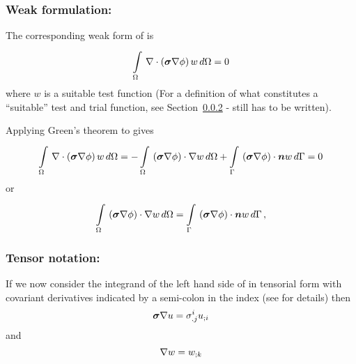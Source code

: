 \subsubsection{Weak formulation:}

The corresponding weak form of  is
\begin{equation}
  \gint{\Omega}{}{\divergence{}{\pbrac{\tensor{\sigma}\gradient{}{\phi}}}w}{\Omega}=0 
  \label{eqn:Laplaceweakform}
\end{equation}
where $w$ is a suitable test function (For a definition of what constitutes a
``suitable'' test and trial function, see Section~\ref{} - still has to be written).

Applying Green's theorem to  gives
\begin{equation}
 \gint{\Omega}{}{\divergence{}{\pbrac{\tensor{\sigma}\gradient{}{\phi}}}w}{\Omega}
 = -\gint{\Omega}{}{\dotprod{\pbrac{\tensor{\sigma}\gradient{}{\phi}}}{\gradient{}{w}}}{\Omega}
   +\gint{\Gamma}{}{\dotprod{\pbrac{\tensor{\sigma}\gradient{}{\phi}}}{\vect{n}}w}{\Gamma}
 = 0
\end{equation}
or
\begin{equation}
  \gint{\Omega}{}{\dotprod{\pbrac{\tensor{\sigma}\gradient{}{\phi}}}{\gradient{}{w}}}{\Omega}
  = \gint{\Gamma}{}{\dotprod{\pbrac{\tensor{\sigma}\gradient{}{\phi}}}{\vect{n}w}}{\Gamma} \,,
  \label{eqn:Laplaceweightedresidualform}
\end{equation}

\subsubsection{Tensor notation:}

If we now consider the integrand of the left hand side of
 in tensorial form with covariant
derivatives indicated by a semi-colon in the index
(see  for details) then
\begin{equation}
  \tensor{\sigma}\gradient{}{u} = \sigma^{i}_{.j}\covarderiv{u}{i}
  \label{eqn:Laplaceweakformfactor1}
\end{equation}
and
\begin{equation}
  \gradient{}{w} = \covarderiv{w}{k}
  \label{eqn:Laplaceweakformfactor2}
\end{equation}

